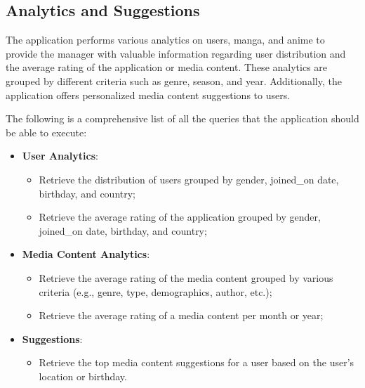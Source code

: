 \subsection*{Analytics and Suggestions}

The application performs various analytics on users, manga, and anime to provide the manager with valuable information 
regarding user distribution and the average rating of the application or media content. These analytics are grouped 
by different criteria such as genre, season, and year. Additionally, the application offers personalized 
media content suggestions to users.

\vspace{\baselineskip}

The following is a comprehensive list of all the queries that the application should be able to execute:

\vspace{\baselineskip}

\begin{itemize}
    \item \textbf{User Analytics}:
    \begin{itemize}
        \item Retrieve the distribution of users grouped by gender, joined\_on date, birthday, and country;
        \item Retrieve the average rating of the application grouped by gender, joined\_on date, birthday, and country;
    \end{itemize}
    
    \item \textbf{Media Content Analytics}:
    \begin{itemize}
        \item Retrieve the average rating of the media content grouped by various criteria (e.g., genre, type, demographics, author, etc.);
        \item Retrieve the average rating of a media content per month or year;
    \end{itemize}
    
    \item \textbf{Suggestions}:
    \begin{itemize} 
        \item Retrieve the top media content suggestions for a user based on the user's location or birthday.
    \end{itemize}
\end{itemize}
    
